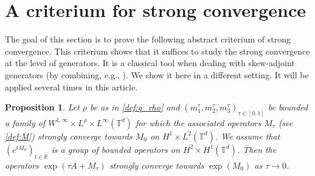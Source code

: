 \documentclass[a4paper]{article}
\theoremstyle{plain}
\newtheorem{proposition}[theorem]{Proposition}
\newcommand{\T}{\mathbb{T}}
\newcommand{\R}{\mathbb{R}}
\begin{document}
\section{A criterium for strong convergence}
\label{sec:CV}



The goal of this section is to prove the following abstract criterium of strong convergence. This criterium shows that it suffices to study the strong convergence 
at the level of generators. It is a classical tool when dealing with skew-adjoint generators (by combining, e.g., \cite[Theorem VIII.21 \& Theorem VIII.25(a)]{rs1}). We show it here in a different setting. It will be applied several times in this article.

\begin{proposition} \label{Lem:strongCV}
Let $\rho$ be as in \eqref{def:q_rho} and $(m_1^{\tau},m_2^{\tau},m_3^{\tau})_{\tau \in [0,1]}$ be bounded a family of $W^{1,\infty} \times L^{\rho} \times L^{\infty}(\mathbb{T}^d)$ for which the associated operators $M_{\tau}$ (see \eqref{def:M}) strongly converge towards $M_0$ on $H^1 \times L^2(\T^d)$. We assume that $(e^{tM_0})_{t\in\R}$ is a group of bounded operators on $H^2 \times H^1(\T^d)$. Then the operators
$\exp(\tau A + M_{\tau})$ 
strongly converge towards 
$\exp(M_0)$ as $\tau \to 0$.
\end{proposition}
\end{document}
